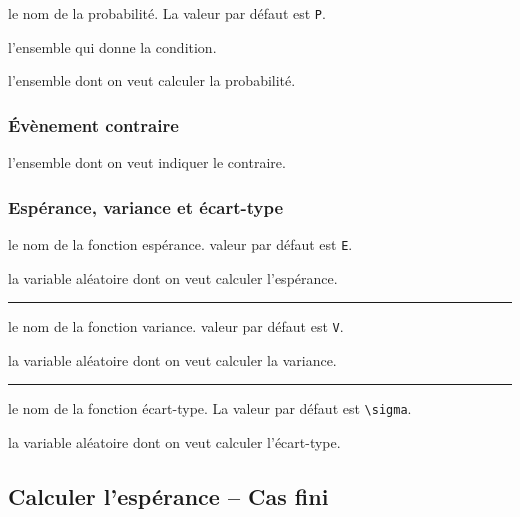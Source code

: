 \documentclass[12pt,a4paper]{article}
\theoremstyle{definition}
\newcommand\separation{
    \medskip
    \hfill\rule{0.5\textwidth}{0.75pt}\hfill
    \medskip
}
\begin{document}



\IDoption{} le nom de la probabilité. La valeur par défaut est \verb#P#.

 l'ensemble qui donne la condition.

 l'ensemble dont on veut calculer la probabilité.


\subsubsection{Évènement contraire}




\IDarg{} l'ensemble dont on veut indiquer le contraire.


\subsubsection{Espérance, variance et écart-type}




\IDoption{} le nom de la fonction espérance. valeur par défaut est \verb#E#.

\IDarg{} la variable aléatoire dont on veut calculer l'espérance.


\separation



\IDoption{} le nom de la fonction variance. valeur par défaut est \verb#V#.

\IDarg{} la variable aléatoire dont on veut calculer la variance.


\separation



\IDoption{} le nom de la fonction écart-type. La valeur par défaut est \verb#\sigma#.

\IDarg{} la variable aléatoire dont on veut calculer l'écart-type.











\subsection{Calculer l'espérance -- Cas fini}
\end{document}
